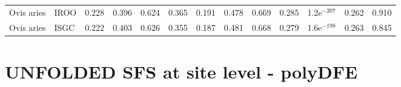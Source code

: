 \begin{longtable}{llrrrrrrrrrrr}
          Ovis aries &                      IROO &                              0.228 &                               0.396 &                 0.624 &                 0.365 &                              0.191 &                               0.478 &                 0.669 &                 0.285 & 1.2e$^{-207}$ &  0.262 &  0.910 \\
          Ovis aries &                      ISGC &                              0.222 &                               0.403 &                 0.626 &                 0.355 &                              0.187 &                               0.481 &                 0.668 &                 0.279 & 1.6e$^{-198}$ &  0.263 &  0.845 \\
\end{longtable}
\newpage\section*{UNFOLDED SFS at site level - polyDFE} 
